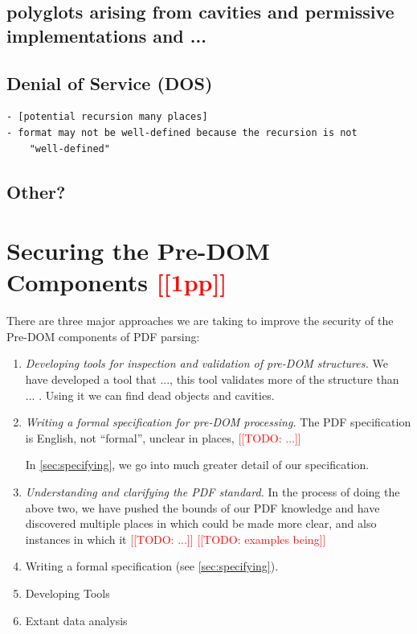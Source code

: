 \documentclass[conference,12pt]{IEEEtran}
\newcommand{\note}[1]{\noteYes{#1}}
\newcommand{\noteYes}[1]{\textcolor{red}{[[#1]]}}
\newcommand{\todo}[1]{\note{TODO: #1}}
\begin{document}
\subsection{polyglots arising from cavities and permissive implementations and ...}

\subsection{Denial of Service (DOS)}

\begin{lstlisting}[style=meta]
- [potential recursion many places]
- format may not be well-defined because the recursion is not
    "well-defined"
\end{lstlisting}

\subsection{Other?}

\section{Securing the Pre-DOM Components \note{1pp}}
\label{sec:securing}

There are three major approaches we are taking to improve the security of the
Pre-DOM components of PDF parsing:
\begin{enumerate}
\item
  \emph{Developing tools for inspection and validation of pre-DOM structures.}
  We have developed a tool that ..., this tool validates more of the structure
  than ... .  Using it we can find dead objects and cavities. 
   
\item
  \emph{Writing a formal specification for pre-DOM processing.}
  The PDF specification \cite{pdfspec} is English, not ``formal'', unclear
  in places, \todo{...}

  In \cref{sec:specifying}, we go into much greater detail of our specification.

\item
  \emph{Understanding and clarifying the PDF standard.}
  In the process of doing the above two, we have pushed the bounds
  of our PDF knowledge and have discovered multiple places in which
  \cite{pdfspec} could be made more clear, and also instances in which
  it \todo{...}
  \todo{examples being}
 \item Writing a formal specification (see \cref{sec:specifying}).

 \item Developing Tools
 
 \item Extant data analysis

\end{enumerate}
\end{document}
